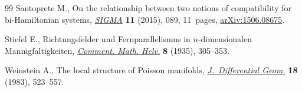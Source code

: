 \documentclass[10pt,a4paper]{amsart}
\numberwithin{equation}{section}
\begin{document}
\begin{thebibliography}{99}
Santoprete M., On the relationship between two notions of compatibility for
 bi-{H}amiltonian systems, \href{https://doi.org/10.3842/SIGMA.2015.089}{\textit{SIGMA}} \textbf{11} (2015), 089, 11~pages,
 \href{https://arxiv.org/abs/1506.08675}{arXiv:1506.08675}.

Stiefel E., Richtungsfelder und {F}ernparallelismus in $n$-dimensionalen
 {M}annigfaltigkeiten, \href{https://doi.org/10.1007/BF01199559}{\textit{Comment. Math. Helv.}} \textbf{8} (1935), 305--353.

Weinstein A., The local structure of {P}oisson manifolds,
 \href{https://doi.org/10.4310/jdg/1214437787}{\textit{J.~Differential Geom.}} \textbf{18} (1983), 523--557.

\end{thebibliography}
\end{document}
